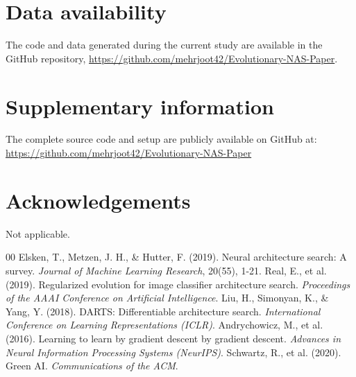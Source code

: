 \documentclass[preprint,12pt,review]{elsarticle}
\begin{document}
\section*{Data availability}
The code and data generated during the current study are available in the GitHub repository, \url{https://github.com/mehrjoot42/Evolutionary-NAS-Paper}.

\section*{Supplementary information}
The complete source code and setup are publicly available on GitHub at: \url{https://github.com/mehrjoot42/Evolutionary-NAS-Paper}

\section*{Acknowledgements}
Not applicable.


\begin{thebibliography}{00}
 Elsken, T., Metzen, J. H., \& Hutter, F. (2019). Neural architecture search: A survey. \textit{Journal of Machine Learning Research}, 20(55), 1-21.
 Real, E., et al. (2019). Regularized evolution for image classifier architecture search. \textit{Proceedings of the AAAI Conference on Artificial Intelligence}.
 Liu, H., Simonyan, K., \& Yang, Y. (2018). DARTS: Differentiable architecture search. \textit{International Conference on Learning Representations (ICLR)}.
 Andrychowicz, M., et al. (2016). Learning to learn by gradient descent by gradient descent. \textit{Advances in Neural Information Processing Systems (NeurIPS)}.
 Schwartz, R., et al. (2020). Green AI. \textit{Communications of the ACM}.
\end{thebibliography}
\end{document}
